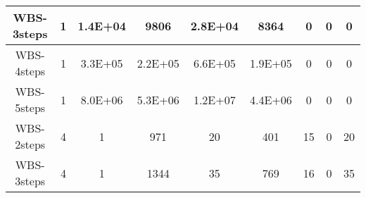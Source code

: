 \begin{table}[]
\begin{tabular}{@{}ccccccccc@{}}
        WBS-3steps                                                  & 1                                                            & 1.4E+04                                                    & 9806                                                        & 2.8E+04                                                        & 8364                                                           & 0                                                          & 0                                                             & 0        \\ \midrule
        WBS-4steps                                                  & 1                                                            & 3.3E+05                                                    & 2.2E+05                                                     & 6.6E+05                                                        & 1.9E+05                                                        & 0                                                          & 0                                                             & 0        \\ \midrule
        WBS-5steps                                                  & 1                                                            & 8.0E+06                                                    & 5.3E+06                                                     & 1.2E+07                                                        & 4.4E+06                                                        & 0                                                          & 0                                                             & 0        \\ \midrule
        WBS-2steps                                                  & 4                                                            & 1                                                          & 971                                                         & 20                                                             & 401                                                            & 15                                                         & 0                                                             & 20       \\ \midrule
        WBS-3steps                                                  & 4                                                            & 1                                                          & 1344                                                        & 35                                                             & 769                                                            & 16                                                         & 0                                                             & 35       \\ \midrule

\end{tabular}
\end{table}
